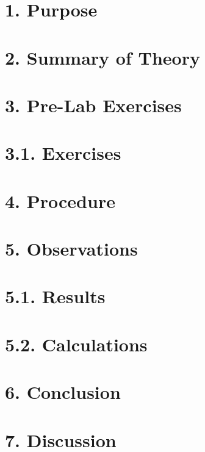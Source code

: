\documentclass[12pt,a4paper]{article}
\begin{document}
\section*{1. Purpose}



\section*{2. Summary of Theory}



\section*{3. Pre-Lab Exercises}



\section*{3.1. Exercises}



\section*{4. Procedure}



\section*{5. Observations}



\section*{5.1. Results}



\section*{5.2. Calculations}



\section*{6. Conclusion}



\section*{7. Discussion}



\nocite{*}

\newpage
{\sloppy
	\printbibliography[title={\textcolor{blue}{References}}]
}
\end{document}
